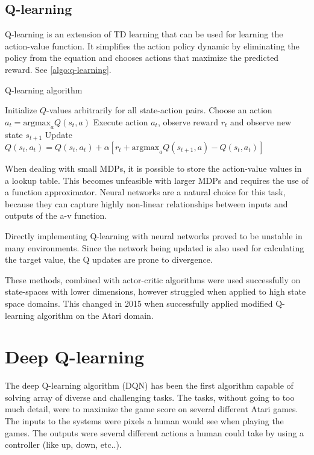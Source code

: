 \subsection{Q-learning}
Q-learning is an extension of TD learning that can be used for learning the action-value function. It simplifies the action policy dynamic by eliminating the policy from the equation and chooses actions that maximize the predicted reward. See \ref{algo:q-learning}.

\begin{algorithm}[h]
  \caption{Q-learning algorithm}
  \begin{algorithmic}
    \STATE Initialize $Q$-values arbitrarily for all state-action pairs.
      \STATE Choose an action $a_t = \text{argmax}_a Q(s_t, a)$
      \STATE Execute action $a_t$, observe reward $r_t$ and observe new state $s_{t+1}$
      \STATE Update $Q(s_t,a_t) = Q(s_t,a_t)+\alpha[r_t + \text{argmax}_a Q(s_{t+1}, a) - Q(s_t,a_t)] $
    \ENDFOR
  \end{algorithmic}
  \label{algo:q-learning}
\end{algorithm}
When dealing with small MDPs, it is possible to store the action-value values in a lookup table. This becomes unfeasible with larger MDPs and requires the use of a function approximator. Neural networks are a natural choice for this task, because they can capture highly non-linear relationships between inputs and outputs of the a-v function.
\medskip

Directly implementing Q-learning with neural networks proved to be unstable in many environments. Since the network being updated is also used for calculating the target value, the Q updates are prone to divergence. 

These methods, combined with actor-critic algorithms were used successfully on state-spaces with lower dimensions, however struggled when applied to high state space domains. This changed in 2015 when \cite{cite:atari} successfully applied modified Q-learning algorithm on the Atari domain.


\section{Deep Q-learning}
The deep Q-learning algorithm (DQN) has been the first algorithm capable of solving array of diverse and challenging tasks. The tasks, without going to too much detail, were to maximize the game score on several different Atari games. The inputs to the systems were pixels a human would see when playing the games. The outputs were several different actions a human could take by using a controller (like up, down, etc..).

